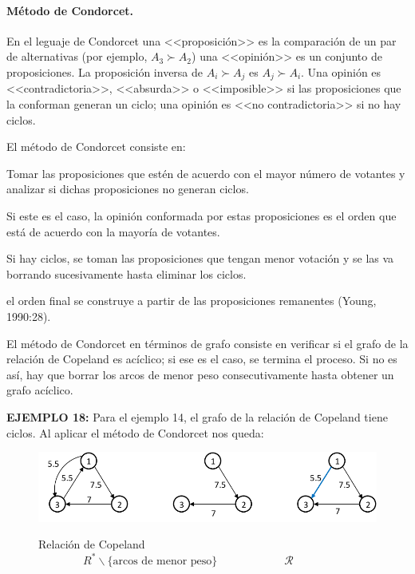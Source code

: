 \documentclass[a5paper,doc,10pt,noapacite]{apa6}
\begin{document}
{{\vspace{-0.5\baselineskip}

\paragraph{Método de Condorcet.}

En el leguaje de Condorcet una <<proposición>> es la comparación de un par de alternativas (por ejemplo, \(A_3 \succ A_2\)) una <<opinión>> es un conjunto de proposiciones. La proposición inversa de \(A_i \succ A_j\) es \(A_j \succ A_i\). Una opinión es <<contradictoria>>, <<absurda>> o <<imposible>> si las proposiciones que la conforman generan un ciclo; una opinión es <<no contradictoria>> si no hay ciclos.

\vspace{1\baselineskip} 
El método de Condorcet consiste en: 
\begin{seriate}
\item Tomar las proposiciones que estén de acuerdo con el mayor número de votantes y analizar si dichas proposiciones no generan ciclos.
\item Si este es el caso, la opinión conformada por estas proposiciones es el orden que está de acuerdo con la mayoría de votantes.
\item Si hay ciclos, se toman las proposiciones que tengan menor votación y se las va borrando sucesivamente hasta eliminar los ciclos.
\item el orden final se construye a partir de las proposiciones remanentes (Young, 1990:28).
\end{seriate}

\vspace{1\baselineskip} 
El método de Condorcet en términos de grafo consiste en verificar si el grafo de la relación de Copeland es acíclico; si ese es el caso, se termina el proceso. Si no es así, hay que borrar los arcos de menor peso consecutivamente hasta obtener un grafo acíclico.

\vspace{1\baselineskip} 
\textbf{EJEMPLO 18:} Para el ejemplo 14, el grafo de la relación de Copeland tiene ciclos. Al aplicar el método de Condorcet nos queda:

\vspace{-1\baselineskip}

\begin{center}
\begin{figure}[H]
	\fontsize{7}{11}\selectfont
	\captionsetup{justification=centering, labelfont=footnotesize, font=footnotesize}
    \centering
    \caption*{Relación de Copeland \(\qquad \qquad  R^* \backslash \{\text{arcos de menor peso}\} \qquad \qquad  \qquad  \mathcal{R}\)}
    \includegraphics[scale=0.75]{Graficos/fig11_RB}	
    \label{fig:RB_grafo11}
\end{figure}
\end{center}

}}
\end{document}
